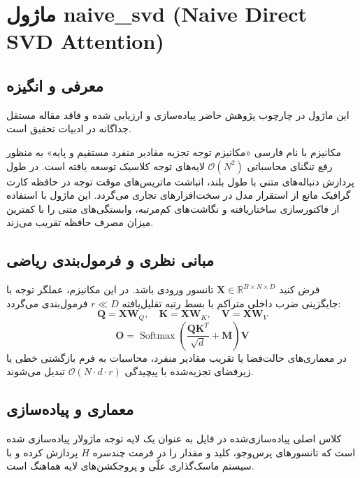 \section{ماژول naive\_svd (Naive Direct SVD Attention)}
\label{sec:module_naive_svd}

\subsection{معرفی و انگیزه}
این ماژول در چارچوب پژوهش حاضر پیاده‌سازی و ارزیابی شده و فاقد مقاله مستقل جداگانه در ادبیات تحقیق است.

مکانیزم  با نام فارسی «مکانیزم توجه تجزیه مقادیر منفرد مستقیم و پایه» به منظور رفع تنگنای محاسباتی $\mathcal{O}(N^2)$ لایه‌های توجه کلاسیک توسعه یافته است. در طول پردازش دنباله‌های متنی با طول بلند، انباشت ماتریس‌های موقت توجه در حافظه کارت گرافیک مانع از استقرار مدل در سخت‌افزارهای تجاری می‌گردد. این ماژول با استفاده از فاکتورسازی ساختاریافته و نگاشت‌های کم‌مرتبه، وابستگی‌های متنی را با کمترین میزان مصرف حافظه تقریب می‌زند.

\subsection{مبانی نظری و فرمول‌بندی ریاضی}
فرض کنید $\mathbf{X} \in \mathbb{R}^{B \times N \times D}$ تانسور ورودی باشد. در این مکانیزم، عملگر توجه با جایگزینی ضرب داخلی متراکم با بسط رتبه تقلیل‌یافته $r \ll D$ فرمول‌بندی می‌گردد:
 \begin{equation}
\mathbf{Q} = \mathbf{X} \mathbf{W}_Q, \quad \mathbf{K} = \mathbf{X} \mathbf{W}_K, \quad \mathbf{V} = \mathbf{X} \mathbf{W}_V
\end{equation}
 \begin{equation}
\mathbf{O} = \operatorname{Softmax}\left(\frac{\mathbf{Q} \mathbf{K}^T}{\sqrt{d}} + \mathbf{M}
\right) \mathbf{V}
\end{equation}
در معماری‌های حالت‌فضا یا تقریب مقادیر منفرد، محاسبات به فرم بازگشتی خطی یا زیرفضای تجزیه‌شده با پیچیدگی $\mathcal{O}(N \cdot d \cdot r)$ تبدیل می‌شوند.

\subsection{معماری و پیاده‌سازی}
کلاس اصلی پیاده‌سازی‌شده در فایل  به عنوان یک لایه توجه ماژولار پیاده‌سازی شده است که تانسورهای پرس‌وجو، کلید و مقدار را در فرمت چندسره $H$ پردازش کرده و با سیستم ماسک‌گذاری علّی و پروجکشن‌های لایه هماهنگ است.

